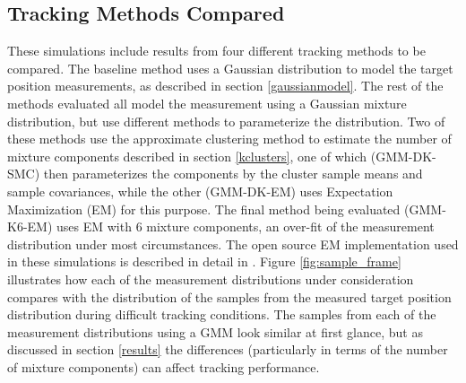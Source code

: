 \documentclass[journal]{IEEEtran}
\begin{document}
\subsection{Tracking Methods Compared}
These simulations include results from four different tracking methods to be compared. The baseline method uses a Gaussian distribution to model the target position measurements, as described in section \ref{gaussianmodel}. The rest of the methods evaluated all model the measurement using a Gaussian mixture distribution, but use different methods to parameterize the distribution. Two of these methods use the approximate clustering method to estimate the number of mixture components described in section \ref{kclusters}, one of which (GMM-DK-SMC) then parameterizes the components by the cluster sample means and sample covariances, while the other (GMM-DK-EM) uses Expectation Maximization (EM) for this purpose. The final method being evaluated (GMM-K6-EM) uses EM with 6 mixture components, an over-fit of the measurement distribution under most circumstances. The open source EM implementation used in these simulations is described in detail in \cite{sanderson2017open}. Figure \ref{fig:sample_frame} illustrates how each of the measurement distributions under consideration compares with the distribution of the samples from the measured target position distribution during difficult tracking conditions. The samples from each of the measurement distributions using a GMM look similar at first glance, but as discussed in section \ref{results} the differences (particularly in terms of the number of mixture components) can affect tracking performance.
\end{document}
